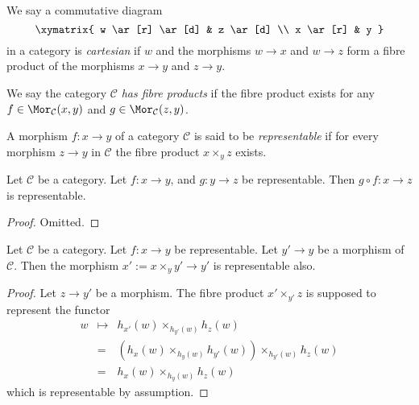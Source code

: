 \begin{definition}
\label{definition-cartesian}
We say a commutative diagram
$$
\xymatrix{
w \ar[r] \ar[d] &
z \ar[d] \\
x \ar[r] &
y
}
$$
in a category is {\it cartesian} if $w$ and the morphisms $w \to x$ and
$w \to z$ form a fibre product of the morphisms $x \to y$ and $z \to y$.
\end{definition}

\begin{definition}
\label{definition-has-fibre-products}
We say the category $\mathcal{C}$ {\it has fibre products} if
the fibre product exists for any $f\in \Mor_{\mathcal C}(x, y)$
and $g\in \Mor_{\mathcal C}(z, y)$.
\end{definition}

\begin{definition}
\label{definition-representable-morphism}
A morphism $f : x \to y$ of a category $\mathcal{C}$ is said to be
{\it representable} if for every morphism $z \to y$
in $\mathcal{C}$ the fibre product $x \times_y z$ exists.
\end{definition}

\begin{lemma}
\label{lemma-composition-representable}
Let $\mathcal{C}$ be a category.
Let $f : x \to y$, and $g : y \to z$ be representable.
Then $g \circ f : x \to z$ is representable.
\end{lemma}

\begin{proof}
Omitted.
\end{proof}

\begin{lemma}
\label{lemma-base-change-representable}
Let $\mathcal{C}$ be a category.
Let $f : x \to y$ be representable.
Let $y' \to y$ be a morphism of $\mathcal{C}$.
Then the morphism $x' := x \times_y y' \to y'$ is representable also.
\end{lemma}

\begin{proof}
Let $z \to y'$ be a morphism. The fibre product
$x' \times_{y'} z$ is supposed to represent the
functor
\begin{eqnarray*}
w & \mapsto & h_{x'}(w)\times_{h_{y'}(w)} h_z(w) \\
& = & (h_x(w) \times_{h_y(w)} h_{y'}(w)) \times_{h_{y'}(w)} h_z(w) \\
& = & h_x(w) \times_{h_y(w)} h_z(w)
\end{eqnarray*}
which is representable by assumption.
\end{proof}

